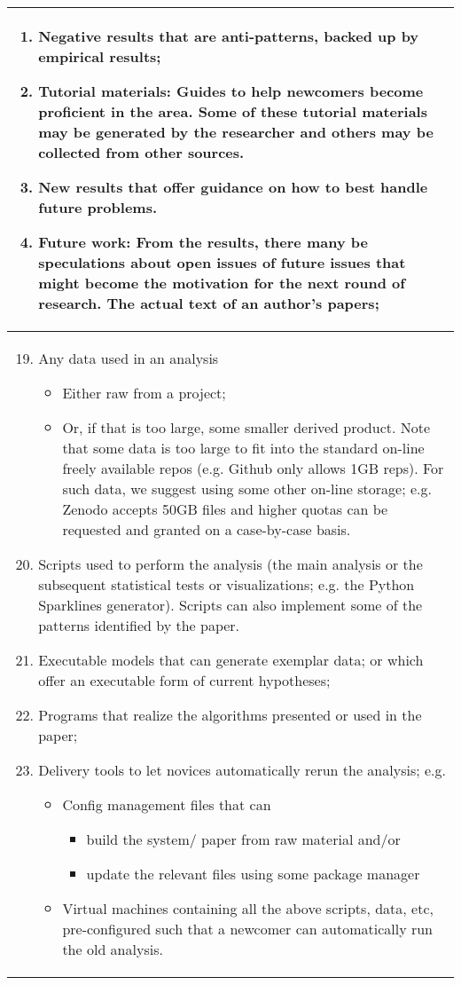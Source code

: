 \begin{table}[!t]
{\begin{tabular}{|p{.96\linewidth}|}
\begin{enumerate}
\item Negative results that are anti-patterns, backed up by empirical results;
\item Tutorial materials: Guides to help newcomers become proficient in the area. Some of these tutorial materials may be generated by the researcher and others may be collected from other sources.
\item New results that offer guidance on how to best handle future problems.
\item Future work: From the results, there many be speculations about open issues of future issues that might become the motivation for the next round of research.
The actual text of an author's papers;
\end{enumerate}\\\hline

\rowcolor{green!5}\begin{enumerate}
 \setcounter{enumi}{18}
 
\item Any data used in an analysis
\begin{itemize}
\item
Either raw from a project;
\item
Or, if that is too large, some smaller derived product. Note that some data is too large to fit into the standard on-line freely available repos (e.g. Github only allows 1GB reps). For such data, we suggest using some other on-line storage; e.g. Zenodo accepts  50GB files and  higher quotas can be requested and granted on a case-by-case basis.
\end{itemize}
\item Scripts used to perform the analysis (the main analysis or the subsequent statistical tests or visualizations; e.g. the Python Sparklines generator). Scripts can also implement some of the patterns identified by the paper.
\item Executable models that can generate exemplar data; or which offer an executable form of current hypotheses;
\item Programs that realize the algorithms presented or used in the paper;
\item Delivery tools to let novices automatically rerun the analysis; e.g.
\begin{itemize}
\item
  Config management files that can
  \begin{itemize}
\item
build the system/ paper from raw material and/or
\item
update the relevant files using some package manager
\end{itemize}
\item
Virtual machines containing all the above scripts, data, etc, pre-configured such that a newcomer can automatically run the old analysis.
\end{itemize}
\end{enumerate}\\\hline
\end{tabular}}
\end{table}
